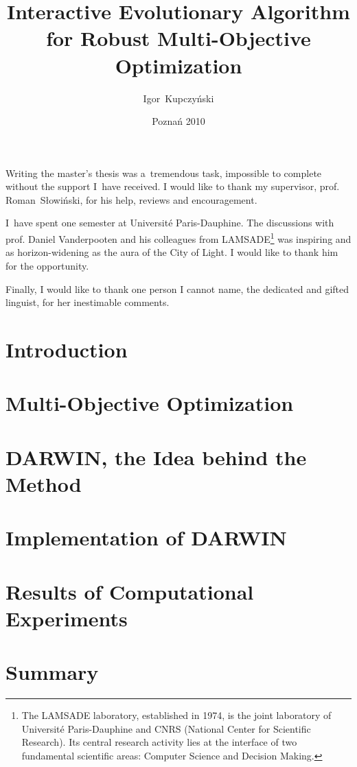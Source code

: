 \documentclass[a4paper,english,thesis]{dcsbook}
\author{Igor~Kupczy\'nski}
\date{Pozna\'n 2010}
\title{Interactive Evolutionary Algorithm \\ for Robust Multi-Objective
  Optimization}
\begin{document}
\maketitle
\frontmatter

\parbox{1cm}{
\vspace{15cm}
}

Writing the master's thesis was a~tremendous task, impossible to complete
without the support I~have received. I would like to thank my supervisor,
prof. Roman~S\l{}owi\'nski, for his help, reviews and encouragement.

I~have spent one semester at Universit\'{e} Paris-Dauphine. The discussions
with prof. Daniel Vanderpooten and his colleagues from LAMSADE\footnote{The
  LAMSADE laboratory, established in 1974, is the joint laboratory of
  Universit\'{e} Paris-Dauphine and CNRS (National Center for Scientific
  Research). Its central research activity lies at the interface of two
  fundamental scientific areas: Computer Science and Decision Making.} was
inspiring and as horizon-widening as the aura of the City of Light. I would
like to thank him for the opportunity.

Finally, I would like to thank one person I cannot name, the dedicated and
gifted linguist, for her inestimable comments.

\tableofcontents{}
\mainmatter

\chapter{Introduction}

\chapter{Multi-Objective Optimization}


\chapter{DARWIN, the Idea behind the Method}
\label{darwin-the-idea}

\chapter{Implementation of DARWIN}
\label{darwin-implementation}


\chapter{Results of Computational Experiments}
\label{exp-results}


\chapter{Summary}


\backmatter



\appendix
\appendixpage
\addappheadtotoc

\end{document}
